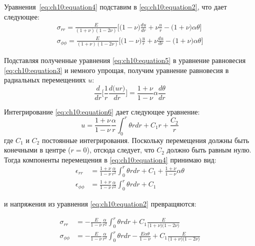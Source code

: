 Уравнения~\cref{eq:ch10:equation4} подставим в \cref{eq:ch10:equation2}, что дает следующее:
\begin{equation}
	\label{eq:ch10:equation5}
	\begin{split}
		\sigma_{rr} = \frac{E}{(1+\nu)(1-2\nu)} \big[\big(1-\nu \big)\frac{du}{dr} + \nu\frac{u}{r} - \big(1+\nu\big )\alpha\theta\big] \\
		\sigma_{\phi\phi} = \frac{E}{(1+\nu)(1-2\nu)} \big[\big(1-\nu \big)\frac{u}{r} + \nu\frac{du}{dr} - \big(1+\nu\big )\alpha\theta\big] 
	\end{split}
\end{equation}

Подставляя полученные уравнения \cref{eq:ch10:equation5} в уравнение равновесия \cref{eq:ch10:equation3} и немного упрощая, получим уравнение равновесия в радиальных перемещениях \(u\):
\begin{equation}
	\label{eq:ch10:equation6}
	\frac {d}{dr} \big[\frac{1}{r} \frac{d \big(ur \big)}{dr} \big] = \frac{1+\nu}{1-\nu}\alpha\frac{d\theta}{dr}
\end{equation}

Интегрирование \cref{eq:ch10:equation6} дает следующее уравнение:
\begin{equation}
	\label{eq:ch10:equation7}
	u = \frac{1+\nu}{1-\nu} \frac{\alpha}{r} \int_0^r \theta rdr +C_1r +\frac{C_2}{r}
\end{equation}
где \(C_1\) и \(C_2\) постоянные интегрирования. Поскольку перемещения должны быть конечными в центре (\(r=0\)), отсюда следует, что \(C_2\) должно быть равным нулю. Тогда компоненты перемещения в \cref{eq:ch10:equation4} принимаю вид:
\begin{equation}
	\label{eq:ch10:equation8}
	\begin{split}
		\epsilon_{rr} &= \frac{1+\nu}{1-\nu} \frac{\alpha}{r^2} \int_0^r \theta rdr +C_1 + \frac{1+\nu}{1-\nu} \alpha\theta\\
		\epsilon_{\phi\phi} &= \frac{1+\nu}{1-\nu} \frac{\alpha}{r^2} \int_0^r \theta rdr +C_1
	\end{split}
\end{equation}

и напряжения из уравнения \cref{eq:ch10:equation2} превращяются:

\begin{equation}
	\label{eq:ch10:equation9}
	\begin{split}
		\sigma_{rr} &= -\frac{E}{1-\nu} \frac{\alpha}{r^2} \int_0^r \theta rdr +C_1 \frac{E}{\big(1+\nu\big)\big(1-2\nu\big)}\\
		\sigma_{\phi\phi} &= -\frac{E}{1-\nu} \frac{\alpha}{r^2} \int_0^r \theta rdr -\frac{E \alpha \theta}{1-\nu} +C_1\frac{E}{\big(1+\nu\big)\big(1-2\nu\big)}
	\end{split}
\end{equation}

